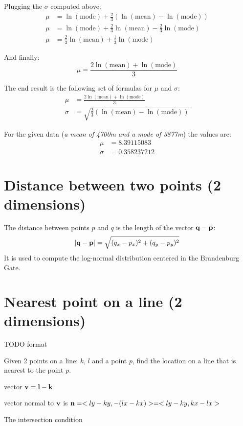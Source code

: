 \documentclass[a4paper,12pt]{article}
\begin{document}
Plugging the \(\sigma\) computed above:
\begin{align*}
  \mu &= \ln(\mbox{mode}) + \frac{2}{3}\left(\ln(\mbox{mean}) - \ln(\mbox{mode})\right)\\
  \mu &= \ln(\mbox{mode}) + \frac{2}{3}\ln(\mbox{mean}) - \frac{2}{3}\ln(\mbox{mode})\\
  \mu &= \frac{2}{3}\ln(\mbox{mean}) + \frac{1}{3}\ln(\mbox{mode})
\end{align*}

And finally:
\[\mu = \frac{2\ln(\mbox{mean}) + \ln(\mbox{mode})}{3}\tag{\(\mu\)}\]

The end result is the following set of formulas for \(\mu\) and \(\sigma\):
\begin{align*}
  \mu &= \frac{2\ln(\mbox{mean}) + \ln(\mbox{mode})}{3}\tag{\(\mu\)}\\
  \sigma &= \sqrt{\frac{2}{3}\left(\ln(\mbox{mean}) - \ln(\mbox{mode})\right)\tag{\(\sigma\)}}
\end{align*}

For the given data (\emph{a mean of 4700m and a mode of 3877m}) the values are:
\begin{align*}
  \mu &= 8.39115083\\
  \sigma &= 0.358237212
\end{align*}


\section{Distance between two points (2 dimensions)}

The distance between points \(p\) and \(q\) is the length of the vector \(\vb{q - p}\):
\[\abs{\vb{q - p}} = \sqrt{(q_x - p_x)^2 + (q_y - p_y)^2}\]
It is used to compute the log-normal distribution centered in the Brandenburg Gate.


\section{Nearest point on a line (2 dimensions)}

TODO format

Given 2 points on a line: \(k\), \(l\) and a point \(p\), find the location on a line that is nearest to the point \(p\).

vector \(\vb{v} = \vb{l-k}\) \(<lx - kx, ly - ky>\)

vector normal to \(\vb{v}\) is \(\vb{n} = <ly - ky, -(lx - kx)> = <ly-ky, kx-lx>\)

The intersection condition
\end{document}
